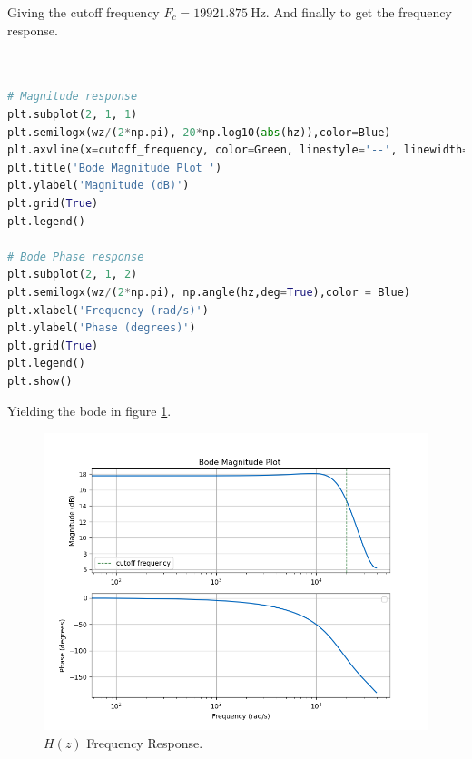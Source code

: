 Giving the cutoff frequency $F_c = 19921.875~\si{\Hz}$. And finally to get the frequency response.

\begin{lstlisting}[language=python, caption = Specification Definition]


# Magnitude response
plt.subplot(2, 1, 1)
plt.semilogx(wz/(2*np.pi), 20*np.log10(abs(hz)),color=Blue)
plt.axvline(x=cutoff_frequency, color=Green, linestyle='--', linewidth=1)
plt.title('Bode Magnitude Plot ')
plt.ylabel('Magnitude (dB)')
plt.grid(True)
plt.legend()

# Bode Phase response
plt.subplot(2, 1, 2)
plt.semilogx(wz/(2*np.pi), np.angle(hz,deg=True),color = Blue)
plt.xlabel('Frequency (rad/s)')
plt.ylabel('Phase (degrees)')
plt.grid(True)
plt.legend()
plt.show()

\end{lstlisting}

Yielding the bode in figure \ref{fig:IIRBode}.

\begin{figure}[H]
    \centering
    \includegraphics*[scale = 0.5]{Images/IIRBode.png}
    \caption{$H(z)$ Frequency Response.}
    \label{fig:IIRBode}
\end{figure}


